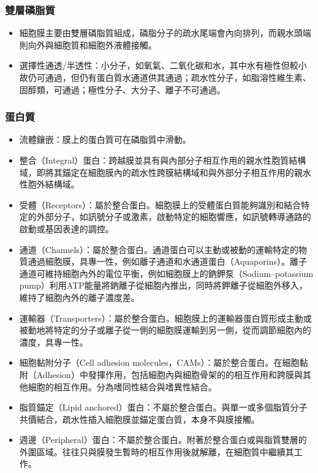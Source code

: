 \documentclass[a4paper,12pt]{report}
\begin{document}
\subsubsection{雙層磷脂質}
\begin{itemize}
  \item 細胞膜主要由雙層磷脂質組成，磷脂分子的疏水尾端會內向排列，而親水頭端則向外與細胞質和細胞外液體接觸。
  \item 選擇性通透/半透性：小分子，如氧氣、二氧化碳和水，其中水有極性但較小故仍可通過，但仍有蛋白質水通道供其通過；疏水性分子，如脂溶性維生素、固醇類，可通過；極性分子、大分子、離子不可通過。
\end{itemize}
\subsubsection{蛋白質}
\begin{itemize}
  \item 流體鑲嵌：膜上的蛋白質可在磷脂質中滑動。
  \item 整合（Integral）蛋白：跨越膜並具有與內部分子相互作用的親水性胞質結構域，即將其錨定在細胞膜內的疏水性跨膜結構域和與外部分子相互作用的親水性胞外結構域。
    \item 受體（Receptors）：屬於整合蛋白。細胞膜上的受體蛋白質能夠識別和結合特定的外部分子，如訊號分子或激素，啟動特定的細胞響應，如訊號轉導通路的啟動或基因表達的調控。
    \item 通道（Channels）：屬於整合蛋白。通道蛋白可以主動或被動的運輸特定的物質通過細胞膜，具專一性，例如離子通道和水通道蛋白（Aquaporins）。離子通道可維持細胞內外的電位平衡，例如細胞膜上的鈉鉀泵（Sodium–potassium pump）利用ATP能量將鈉離子從細胞內推出，同時將鉀離子從細胞外移入，維持了細胞內外的離子濃度差。 
    \item 運輸器（Transporters）：屬於整合蛋白。細胞膜上的運輸器蛋白質形成主動或被動地將特定的分子或離子從一側的細胞膜運輸到另一側，從而調節細胞內的濃度，具專一性。
    \item 細胞黏附分子（Cell adhesion molecules，CAMs）：屬於整合蛋白。在細胞黏附（Adhesion）中發揮作用，包括細胞內與細胞骨架的的相互作用和跨膜與其他細胞的相互作用。分為嗜同性結合與嗜異性結合。
  \item 脂質錨定（Lipid anchored）蛋白：不屬於整合蛋白。與單一或多個脂質分子共價結合，疏水性插入細胞膜並錨定蛋白質，本身不與膜接觸。
  \item 週邊（Peripheral）蛋白：不屬於整合蛋白。附著於整合蛋白或與脂質雙層的外圍區域。往往只與膜發生暫時的相互作用後就解離，在細胞質中繼續其工作。
\end{itemize}
\end{document}
